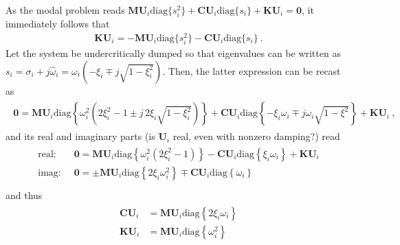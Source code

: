 \documentclass[letterpaper,10pt,english]{jupyterBook}
\begin{document}
\sphinxAtStartPar
As the modal problem reads \(\mathbf{M} \mathbf{U}_i \text{diag}\{ s^2_i \} + \mathbf{C} \mathbf{U}_i \text{diag}\{ s_i \} + \mathbf{K} \mathbf{U}_i = \mathbf{0}\), it immediately follows that
\begin{equation*}
\begin{split}\mathbf{K} \mathbf{U}_i = - \mathbf{M} \mathbf{U}_i \text{diag}\{ s_i^2 \} - \mathbf{C} \mathbf{U}_i \text{diag}\{ s_i \} \ .\end{split}
\end{equation*}
\sphinxAtStartPar
Let the system be under\sphinxhyphen{}critically dumped so that eigenvalues can be written as \(s_i = \sigma_i + j \hat{\omega}_i = \omega_i \left( - \xi_i \mp j \sqrt{ 1 - \xi^2_i } \right)\). Then, the latter expression can be recast as
\begin{equation*}
\begin{split}\begin{aligned}
  \mathbf{0} = \mathbf{M} \mathbf{U}_i \text{diag}\left\{ \omega^2_i \left( 2 \xi_i^2 - 1 \pm j \, 2 \xi_i \sqrt{ 1 - \xi^2_i } \right) \right\} + \mathbf{C} \mathbf{U}_i \text{diag}\left\{ -\xi_i \omega_i \mp j \omega_i \sqrt{ 1 - \xi^2 } \right\} + \mathbf{K} \mathbf{U}_i \ , 
\end{aligned}\end{split}
\end{equation*}
\sphinxAtStartPar
and its real and imaginary parts (is \(\mathbf{U}_i\) real, even with non\sphinxhyphen{}zero damping?) read
\begin{equation*}
\begin{split}\begin{aligned}
  \text{real: } \ & \mathbf{0} = \mathbf{M} \mathbf{U}_i \text{diag} \left\{ \omega_i^2 \left( 2 \xi_i^2 - 1 \right) \right\} - \mathbf{C} \mathbf{U}_i \text{diag}\left\{ \xi_i \omega_i  \right\} + \mathbf{K} \mathbf{U}_i  \\
  \text{imag: } \ & \mathbf{0} = \pm  \mathbf{M} \mathbf{U}_i \text{diag}\left\{ 2 \xi_i \omega_i^2 \right\} \mp \mathbf{C} \mathbf{U}_i \text{diag}\left\{ \omega_i \right\} \\
\end{aligned}\end{split}
\end{equation*}
\sphinxAtStartPar
and thus
\begin{equation*}
\begin{split}\begin{aligned}
  \mathbf{C} \mathbf{U}_i & = \mathbf{M} \mathbf{U}_i \text{diag} \left\{ 2 \xi_i \omega_i \right\} \\
  \mathbf{K} \mathbf{U}_i & = \mathbf{M} \mathbf{U}_i \text{diag} \left\{ \omega_i^2 \right\}
\end{aligned}\end{split}
\end{equation*}
\end{document}
